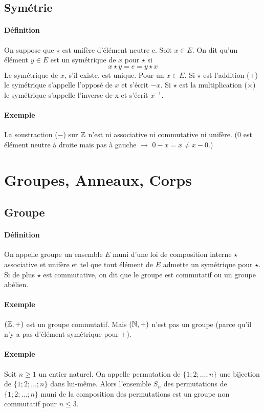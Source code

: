%
\subsection{Symétrie}
%
\paragraph{Définition} On suppose que $\star$ est unifère d'élément neutre e. Soit $x \in E$. On dit qu'un élément $y \in E$ est un symétrique de $x$ pour $\star$ si
$$ x \star y = e = y \star x$$
Le symétrique de $x$, s'il existe, est unique. Pour un $x \in E$. Si $\star$ est l'addition ($+$) le symétrique s'appelle l'opposé de $x$ et s'écrit $-x$. Si $\star$ est la multiplication ($\times$) le symétrique s'appelle l'inverse de x et s'écrit $x^{-1}$.
 
\paragraph{Exemple} La soustraction ($-$) sur $\mathbb{Z}$ n'est ni associative ni commutative ni unifère. ($0$ est élément neutre à droite mais pas à gauche $\rightarrow$ $0 - x = x \neq x - 0$.)

%
%
\section{Groupes, Anneaux, Corps}
%
%
%
\subsection{Groupe}
%
\paragraph{Définition} On appelle groupe un ensemble $E$ muni d'une loi de composition interne $\star$ associative et unifère et tel que tout élément de $E$ admette un symétrique pour $\star$. \\
Si de plus $\star$ est commutative, on dit que le groupe est commutatif ou un groupe abélien.

\paragraph{Exemple}
$(\mathbb{Z}, +)$ est un groupe commutatif. Mais $(\mathbb{N}, +)$ n'est pas un groupe (parce qu'il n'y a pas d'élément symétrique pour $+$).

\paragraph{Exemple} Soit $n \geq 1$ un entier naturel. On appelle permutation de $\{ 1; 2; \ldots ; n\}$ une bijection de $\{ 1; 2; \ldots ; n\}$ dans lui-même. Alors l'ensemble $S_n$ des permutations de $\{ 1; 2; \ldots ; n\}$ muni de la composition des permutations est un groupe non commutatif pour $n \leq 3$.

